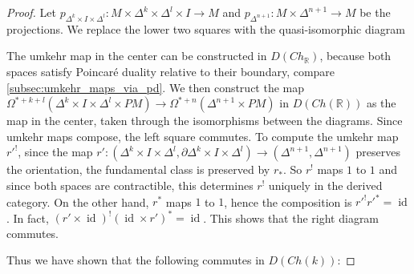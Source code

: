\documentclass{scrartcl}
\theoremstyle{plain}
\theoremstyle{definition}
\newcommand{\R}{\mathbb R}
\DeclareMathOperator{\id}{id}
\newcommand{\comp}{\mathbin{\circ}}
\begin{document}
\begin{proof}
    Let $p_{\Delta^k\times I\times\Delta^l}\colon M\times\Delta^k\times\Delta^l\times I \to M$ and $p_{\Delta^{n+1}}\colon M\times \Delta^{n+1}\to M$ be the projections. We replace the lower two squares with the quasi-isomorphic diagram
    \begin{center}
    \end{center}
    The umkehr map in the center can be constructed in $D(Ch_\R)$, because both spaces satisfy Poincaré duality relative to their boundary, compare \cref{subsec:umkehr_maps_via_pd}. 
    We then construct the map $\Omega^{*+k+l}(\Delta^k\times I\times \Delta^l\times PM)\to \Omega^{*+n}(\Delta^{n+1}\times PM)$ in $D(Ch(\R))$ as the map in the center, taken through the isomorphisms between the diagrams. Since umkehr maps compose, the left square commutes. To compute the umkehr map $r'^!$, since the map $r'\colon (\Delta^k\times I\times \Delta^l, \partial \Delta^k\times I\times \Delta^l)\to (\Delta^{n+1}, \Delta^{n+1})$ preserves the orientation, the fundamental class is preserved by $r_*$. So $r^!$ maps $1$ to $1$ and since both spaces are contractible, this determines $r^!$ uniquely in the derived category. On the other hand, $r^*$ maps $1$ to $1$, hence the composition is $r'^! r'^* = \id$. In fact, $(r'\times \id)^!(\id\times r')^* = \id$. This shows that the right diagram commutes. 

    Thus we have shown that the following commutes in $D(Ch(k))$: 


\end{proof}
\end{document}
